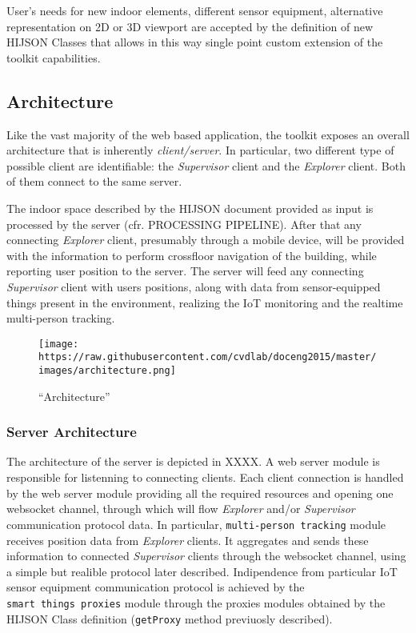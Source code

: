 \documentclass[]{article}
\begin{document}
User's needs for new indoor elements, different sensor equipment,
alternative representation on 2D or 3D viewport are accepted by the
definition of new HIJSON Classes that allows in this way single point
custom extension of the toolkit capabilities.

\subsection{Architecture}\label{architecture}

Like the vast majority of the web based application, the toolkit exposes
an overall architecture that is inherently \emph{client/server}. In
particular, two different type of possible client are identifiable: the
\emph{Supervisor} client and the \emph{Explorer} client. Both of them
connect to the same server.

The indoor space described by the HIJSON document provided as input is
processed by the server (cfr. PROCESSING PIPELINE). After that any
connecting \emph{Explorer} client, presumably through a mobile device,
will be provided with the information to perform crossfloor navigation
of the building, while reporting user position to the server. The server
will feed any connecting \emph{Supervisor} client with users positions,
along with data from sensor-equipped things present in the environment,
realizing the IoT monitoring and the realtime multi-person tracking.

\begin{figure}[htbp]
\centering
\texttt{[image: https://raw.githubusercontent.com/cvdlab/doceng2015/master/images/architecture.png]}
\caption{``Architecture''}
\end{figure}

\subsubsection{Server Architecture}\label{server-architecture}

The architecture of the server is depicted in XXXX. A web server module
is responsible for listenning to connecting clients. Each client
connection is handled by the web server module providing all the
required resources and opening one websocket channel, through which will
flow \emph{Explorer} and/or \emph{Supervisor} communication protocol
data. In particular, \texttt{multi-person\ tracking} module receives
position data from \emph{Explorer} clients. It aggregates and sends
these information to connected \emph{Supervisor} clients through the
websocket channel, using a simple but realible protocol later described.
Indipendence from particular IoT sensor equipment communication protocol
is achieved by the \texttt{smart\ things\ proxies} module through the
proxies modules obtained by the HIJSON Class definition
(\texttt{getProxy} method previuosly described).
\end{document}
